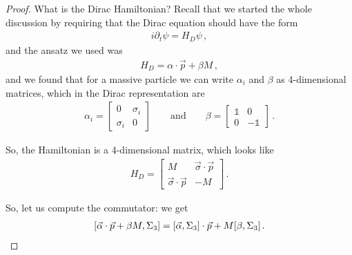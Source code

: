 \documentclass[main.tex]{subfiles}
\begin{document}
\begin{proof}
What is the Dirac Hamiltonian? 
Recall that we started the whole discussion by requiring that the Dirac equation should have the form 
%
\begin{align}
i \partial_{t} \psi = H_D \psi 
\,,
\end{align}
%
and the ansatz we used was 
%
\begin{align}
H_D = \alpha \cdot \vec{p} + \beta M
\,,
\end{align}
%
and we found that for a massive particle we can write \(\alpha_{i}\) and \(\beta \) as 4-dimensional matrices, which in the Dirac representation are 
%
\begin{align}
\alpha_{i} = \left[\begin{array}{cc}
0 & \sigma_{i} \\ 
\sigma_{i} & 0
\end{array}\right]
\qquad \text{and} \qquad
\beta = \left[\begin{array}{cc}
\mathbb{1} & 0 \\ 
0 & -\mathbb{1}
\end{array}\right]
\,.
\end{align}

So, the Hamiltonian is a 4-dimensional matrix, which looks like 
%
\begin{align}
H_D = \left[\begin{array}{cc}
M & \vec{\sigma} \cdot \vec{p}\\ 
 \vec{\sigma} \cdot \vec{p} & -M
\end{array}\right]
\,.
\end{align}

So, let us compute the commutator: we get 
%
\begin{align}
\qty[\vec{\alpha} \cdot \vec{p} + \beta M, \Sigma_3 ]
= \qty[\vec{\alpha}, \Sigma_{3}] \cdot \vec{p} + M \qty[\beta, \Sigma_3 ]
\,.
\end{align}


\end{proof}
\end{document}
